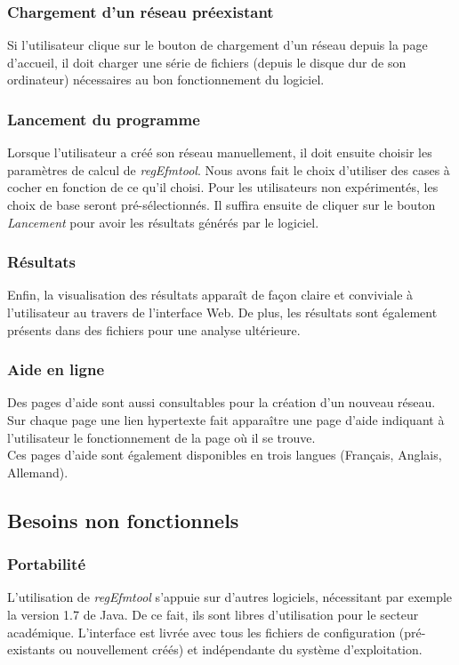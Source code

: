 \subsubsection{Chargement d'un réseau préexistant}
Si l'utilisateur clique sur le bouton de chargement d'un réseau depuis la page d'accueil, il doit charger une série de fichiers (depuis le disque dur de son ordinateur) nécessaires au bon fonctionnement du logiciel. 

\subsubsection{Lancement du programme}
Lorsque l'utilisateur a créé son réseau manuellement, il doit ensuite choisir les paramètres de calcul de \textit{regEfmtool}. Nous avons fait le choix d'utiliser des cases à cocher en fonction de ce qu'il choisi. Pour les utilisateurs non expérimentés, les choix de base seront pré-sélectionnés. Il suffira ensuite de cliquer sur le bouton \emph{Lancement} pour avoir les résultats générés par le logiciel.

\subsubsection{Résultats}
Enfin, la visualisation des résultats apparaît de façon claire et conviviale à l'utilisateur au travers de l'interface Web. De plus, les résultats sont également présents dans des fichiers pour une analyse ultérieure. %

\subsubsection{Aide en ligne}

Des pages d'aide sont aussi consultables pour la création d'un nouveau réseau.
Sur chaque page une lien hypertexte fait apparaître une page d'aide indiquant à l'utilisateur le fonctionnement de la page où il se trouve.\\
Ces pages d'aide sont également disponibles en trois langues (Français, Anglais, Allemand).
		
\subsection{Besoins non fonctionnels}

\subsubsection{Portabilité}
L'utilisation de \textit{regEfmtool} s'appuie sur d'autres logiciels, nécessitant par exemple la version 1.7 de Java. De ce fait, ils sont libres d'utilisation pour le secteur académique. L'interface est livrée avec tous les fichiers de configuration (pré-existants ou nouvellement créés) et indépendante du système d'exploitation. 

